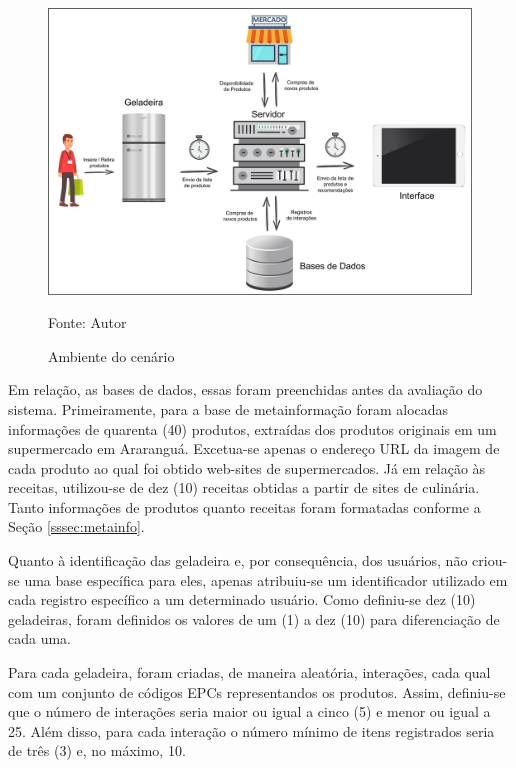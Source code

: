 \begin{figure}[htb]
    \caption{Ambiente do cenário}
    \label{fig:cap5_ambiente-cenario}
    \includegraphics[width=\textwidth]{figuras/cap5_cenario.png}
    
    \footnotesize{Fonte: Autor}
\end{figure}

Em relação, as bases de dados, essas foram preenchidas antes da avaliação do sistema. 
Primeiramente, para a base de metainformação foram alocadas informações de quarenta (40) produtos, extraídas dos produtos originais em um supermercado em Araranguá. Excetua-se apenas o endereço URL da imagem de cada produto ao qual foi obtido web-sites de supermercados. 
Já em relação às receitas, utilizou-se de dez (10) receitas obtidas a partir de sites de culinária. Tanto informações  de produtos quanto receitas foram formatadas conforme a Seção \ref{sssec:metainfo}.

Quanto à identificação das geladeira e, por consequência, dos usuários, não criou-se uma base específica para eles, apenas atribuiu-se um identificador utilizado em cada registro específico a um determinado usuário. Como definiu-se dez (10) geladeiras, foram definidos os valores de um (1) a dez (10) para diferenciação de cada uma.

Para cada geladeira, foram criadas, de maneira aleatória, interações, cada qual com um conjunto de códigos EPCs representandos os produtos. Assim, definiu-se que o número de interações seria maior ou igual a cinco (5) e menor ou igual a 25. Além disso, para cada interação o número mínimo de itens registrados seria de três (3) e, no máximo, 10.

